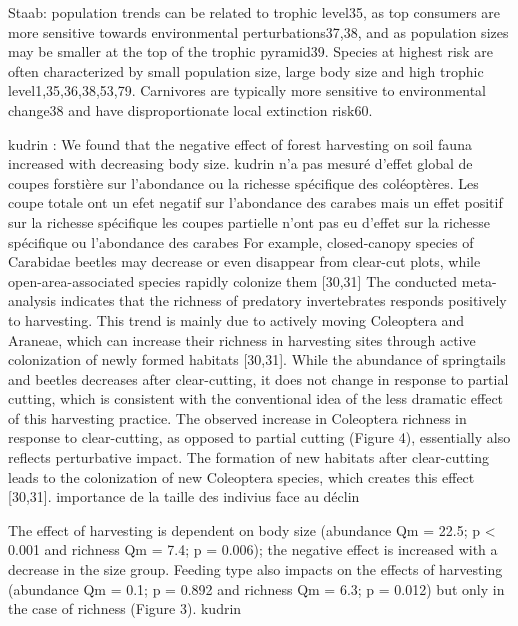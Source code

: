 Staab:
population trends can be related to trophic level35, as top consumers are more sensitive towards environmental perturbations37,38, and as population sizes may be smaller at the top of the trophic pyramid39.
Species at highest risk are often characterized by small population size, large body size and high trophic level1,35,36,38,53,79.
Carnivores are typically more sensitive to environmental change38 and have  disproportionate local extinction risk60.











kudrin :
We found that the negative effect of forest harvesting on soil fauna increased with decreasing body size.
kudrin n'a pas mesuré d'effet global de coupes forstière sur l'abondance ou la richesse spécifique des coléoptères.
Les coupe totale ont un efet negatif sur l'abondance des carabes mais un effet positif sur la richesse spécifique
les coupes partielle n'ont pas eu d'effet sur la richesse spécifique ou l'abondance des carabes
For example, closed-canopy species of Carabidae beetles may decrease or even disappear from clear-cut plots, while open-area-associated species rapidly colonize them [30,31]
The conducted meta-analysis indicates that the richness of predatory invertebrates responds positively to harvesting. This trend is mainly due to actively moving Coleoptera and Araneae, which can increase their richness in harvesting sites through active colonization of newly formed habitats [30,31].
While the abundance of springtails and beetles decreases after clear-cutting, it does not change in response to partial cutting, 
which is consistent with the conventional idea of the less dramatic effect of this harvesting practice. 
The observed increase in Coleoptera richness in response to clear-cutting, as opposed to partial cutting (Figure 4), essentially also reflects perturbative impact. 
The formation of new habitats after clear-cutting leads to the colonization of new Coleoptera species, which creates this effect [30,31].
  importance de la taille des indivius face au déclin

  The effect of harvesting is dependent on body size (abundance Qm = 22.5; p < 0.001 and richness Qm = 7.4; p = 0.006); the negative effect is increased with a decrease in the size group. Feeding type also impacts on the effects of harvesting (abundance Qm = 0.1; p = 0.892 and richness Qm = 6.3; p = 0.012) but only in the case of richness (Figure 3). kudrin

